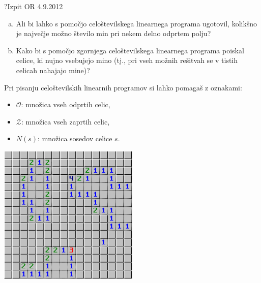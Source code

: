 \begin{naloga}{?}{Izpit OR 4.9.2012}
\begin{vprasanje}[minolovec]
\begin{enumerate}[(a)]
\item Ali bi lahko s pomočjo celoštevilskega linearnega programa ugotovil,
kolikšno je največje možno število min pri nekem delno odprtem polju?

\item Kako bi s pomočjo zgornjega celoštevilskega linearnega programa
poiskal celice, ki nujno vsebujejo mino
(tj., pri vseh možnih rešitvah se v tistih celicah nahajajo mine)?
\end{enumerate}
Pri pisanju celoštevilskih linearnih programov si lahko pomagaš z oznakami:
\begin{itemize}
\item ${\mathcal O}$: množica vseh odprtih celic,
\item ${\mathcal Z}$: množica vseh zaprtih celic,
\item $N(s)$: množica sosedov celice $s$.
\end{itemize}

\begin{slika}
\includegraphics[width=0.5\textwidth]{slike/minolovec.png}
\end{slika}
\end{vprasanje}
\begin{odgovor}
\end{odgovor}
\end{naloga}


